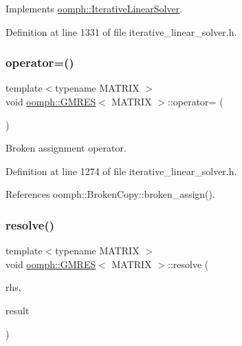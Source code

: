 Implements \hyperlink{classoomph_1_1IterativeLinearSolver_a5fe7f7b5e4847fdbd4f95d3875ec7a46}{oomph\+::\+Iterative\+Linear\+Solver}.



Definition at line 1331 of file iterative\+\_\+linear\+\_\+solver.\+h.

\mbox{\label{classoomph_1_1GMRES_a01ff65b52b1a05602372ccc543b62935}} 
\subsubsection{\texorpdfstring{operator=()}{operator=()}}
{\footnotesize\ttfamily template$<$typename M\+A\+T\+R\+IX $>$ \\
void \hyperlink{classoomph_1_1GMRES}{oomph\+::\+G\+M\+R\+ES}$<$ M\+A\+T\+R\+IX $>$\+::operator= (\begin{DoxyParamCaption}\item[{const \hyperlink{classoomph_1_1GMRES}{G\+M\+R\+ES}$<$ M\+A\+T\+R\+IX $>$ \&}]{ }\end{DoxyParamCaption})\hspace{0.3cm}{\ttfamily [inline]}}



Broken assignment operator. 



Definition at line 1274 of file iterative\+\_\+linear\+\_\+solver.\+h.



References oomph\+::\+Broken\+Copy\+::broken\+\_\+assign().

\mbox{\label{classoomph_1_1GMRES_a18e32688dcbd8806f1f23d754fc712a3}} 
\subsubsection{\texorpdfstring{resolve()}{resolve()}}
{\footnotesize\ttfamily template$<$typename M\+A\+T\+R\+IX $>$ \\
void \hyperlink{classoomph_1_1GMRES}{oomph\+::\+G\+M\+R\+ES}$<$ M\+A\+T\+R\+IX $>$\+::resolve (\begin{DoxyParamCaption}\item[{const \hyperlink{classoomph_1_1DoubleVector}{Double\+Vector} \&}]{rhs,  }\item[{\hyperlink{classoomph_1_1DoubleVector}{Double\+Vector} \&}]{result }\end{DoxyParamCaption})\hspace{0.3cm}{\ttfamily [virtual]}}



